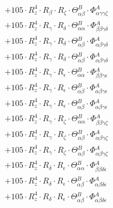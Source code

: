 \documentclass{article}
\begin{document}
\begin{subequations}
\begin{gather}
\begin{array}{c}
 \\[0.2em] 		 + 105 \cdot R_{z}^{4} \cdot R_{\beta{}} \cdot R_{\zeta{}} \cdot \Theta{}^{B}_{\alpha{}\beta{}} \cdot \Phi{}^{A}_{\alpha{}\gamma{}\gamma{}\zeta{}} 
 \\[0.2em] 		 + 105 \cdot R_{z}^{4} \cdot R_{\gamma{}} \cdot R_{\delta{}} \cdot \Theta{}^{B}_{\alpha{}\alpha{}} \cdot \Phi{}^{A}_{\beta{}\beta{}\gamma{}\delta{}} 
 \\[0.2em] 		 + 105 \cdot R_{z}^{4} \cdot R_{\gamma{}} \cdot R_{\delta{}} \cdot \Theta{}^{B}_{\alpha{}\beta{}} \cdot \Phi{}^{A}_{\alpha{}\beta{}\gamma{}\delta{}} 
 \\[0.2em] 		 + 105 \cdot R_{z}^{4} \cdot R_{\gamma{}} \cdot R_{\delta{}} \cdot \Theta{}^{B}_{\alpha{}\beta{}} \cdot \Phi{}^{A}_{\alpha{}\beta{}\gamma{}\delta{}} 
 \\[0.2em] 		 + 105 \cdot R_{z}^{4} \cdot R_{\gamma{}} \cdot R_{\epsilon{}} \cdot \Theta{}^{B}_{\alpha{}\alpha{}} \cdot \Phi{}^{A}_{\beta{}\beta{}\gamma{}\epsilon{}} 
 \\[0.2em] 		 + 105 \cdot R_{z}^{4} \cdot R_{\gamma{}} \cdot R_{\epsilon{}} \cdot \Theta{}^{B}_{\alpha{}\beta{}} \cdot \Phi{}^{A}_{\alpha{}\beta{}\gamma{}\epsilon{}} 
 \\[0.2em] 		 + 105 \cdot R_{z}^{4} \cdot R_{\gamma{}} \cdot R_{\epsilon{}} \cdot \Theta{}^{B}_{\alpha{}\beta{}} \cdot \Phi{}^{A}_{\alpha{}\beta{}\gamma{}\epsilon{}} 
 \\[0.2em] 		 + 105 \cdot R_{z}^{4} \cdot R_{\gamma{}} \cdot R_{\zeta{}} \cdot \Theta{}^{B}_{\alpha{}\alpha{}} \cdot \Phi{}^{A}_{\beta{}\beta{}\gamma{}\zeta{}} 
 \\[0.2em] 		 + 105 \cdot R_{z}^{4} \cdot R_{\gamma{}} \cdot R_{\zeta{}} \cdot \Theta{}^{B}_{\alpha{}\beta{}} \cdot \Phi{}^{A}_{\alpha{}\beta{}\gamma{}\zeta{}} 
 \\[0.2em] 		 + 105 \cdot R_{z}^{4} \cdot R_{\gamma{}} \cdot R_{\zeta{}} \cdot \Theta{}^{B}_{\alpha{}\beta{}} \cdot \Phi{}^{A}_{\alpha{}\beta{}\gamma{}\zeta{}} 
 \\[0.2em] 		 + 105 \cdot R_{z}^{4} \cdot R_{\delta{}} \cdot R_{\epsilon{}} \cdot \Theta{}^{B}_{\alpha{}\alpha{}} \cdot \Phi{}^{A}_{\beta{}\beta{}\delta{}\epsilon{}} 
 \\[0.2em] 		 + 105 \cdot R_{z}^{4} \cdot R_{\delta{}} \cdot R_{\epsilon{}} \cdot \Theta{}^{B}_{\alpha{}\beta{}} \cdot \Phi{}^{A}_{\alpha{}\beta{}\delta{}\epsilon{}} 
 \\[0.2em] 		 + 105 \cdot R_{z}^{4} \cdot R_{\delta{}} \cdot R_{\epsilon{}} \cdot \Theta{}^{B}_{\alpha{}\beta{}} \cdot \Phi{}^{A}_{\alpha{}\beta{}\delta{}\epsilon{}} 

\end{array}
\end{gather}
\end{subequations}
\end{document}
